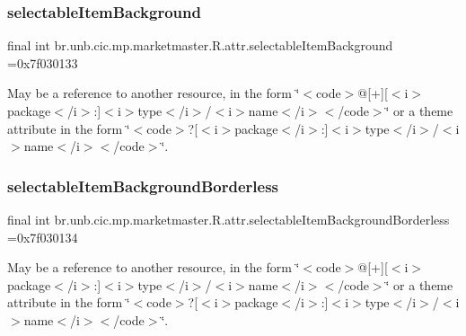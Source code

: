 \subsubsection{\texorpdfstring{selectable\+Item\+Background}{selectableItemBackground}}
{\footnotesize\ttfamily final int br.\+unb.\+cic.\+mp.\+marketmaster.\+R.\+attr.\+selectable\+Item\+Background =0x7f030133\hspace{0.3cm}{\ttfamily [static]}}

May be a reference to another resource, in the form \char`\"{}$<$code$>$@\mbox{[}+\mbox{]}\mbox{[}$<$i$>$package$<$/i$>$\+:\mbox{]}$<$i$>$type$<$/i$>$/$<$i$>$name$<$/i$>$$<$/code$>$\char`\"{} or a theme attribute in the form \char`\"{}$<$code$>$?\mbox{[}$<$i$>$package$<$/i$>$\+:\mbox{]}$<$i$>$type$<$/i$>$/$<$i$>$name$<$/i$>$$<$/code$>$\char`\"{}. \mbox{\label{classbr_1_1unb_1_1cic_1_1mp_1_1marketmaster_1_1R_1_1attr_a8aaba2bcb92d8d7e4a6a1f6c63561713}} 
\subsubsection{\texorpdfstring{selectable\+Item\+Background\+Borderless}{selectableItemBackgroundBorderless}}
{\footnotesize\ttfamily final int br.\+unb.\+cic.\+mp.\+marketmaster.\+R.\+attr.\+selectable\+Item\+Background\+Borderless =0x7f030134\hspace{0.3cm}{\ttfamily [static]}}

May be a reference to another resource, in the form \char`\"{}$<$code$>$@\mbox{[}+\mbox{]}\mbox{[}$<$i$>$package$<$/i$>$\+:\mbox{]}$<$i$>$type$<$/i$>$/$<$i$>$name$<$/i$>$$<$/code$>$\char`\"{} or a theme attribute in the form \char`\"{}$<$code$>$?\mbox{[}$<$i$>$package$<$/i$>$\+:\mbox{]}$<$i$>$type$<$/i$>$/$<$i$>$name$<$/i$>$$<$/code$>$\char`\"{}. \mbox{\label{classbr_1_1unb_1_1cic_1_1mp_1_1marketmaster_1_1R_1_1attr_af08e2b9b1d877cab1e0684dd5d9ee11f}} 
